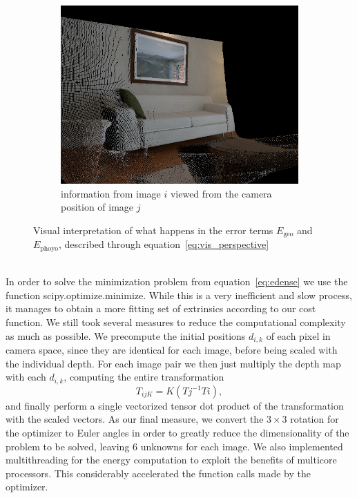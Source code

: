\begin{figure}[ht]
\begin{subfigure}[b]{.45\textwidth}
                \includegraphics[width=.95\textwidth]{images/vis_perspective_02}
                \caption{information from image $i$ viewed from the camera position of image $j$}
                \label{sfig:i_from_j}
            \end{subfigure}
            \caption[]{Visual interpretation of what happens in the error terms $E_{\text{geo}}$ and $E_{\text{phoyo}}$, described through equation~\ref{eq:vis_perspective}}
            \label{fig:vis_perspective}
        \end{figure}\\
        In order to solve the minimization problem from equation~\ref{eq:edense} we use the function scipy.optimize.minimize.
        While this is a very inefficient and slow process, it manages to obtain a more fitting set of extrinsics according to our cost function.
        We still took several measures to reduce the computational complexity as much as possible.
        We precompute the initial positions $d_{i,k}$ of each pixel in camera space, since they are identical for each image, before being scaled with the individual depth.
        For each image pair we then just multiply the depth map with each $d_{i,k}$, computing the entire transformation
        \begin{equation}
            T_{ijK} = K(Tj^{-1}Ti),
        \end{equation}
        and finally perform a single vectorized tensor dot product of the transformation with the scaled vectors.
        As our final measure, we convert the $3\times3$ rotation for the optimizer to Euler angles in order to greatly reduce the dimensionality of the problem to be solved, leaving 6 unknowns for each image.
        We also implemented multithreading for the energy computation to exploit the benefits of multicore processors.
        This considerably accelerated the function calls made by the optimizer.
    \newpage

